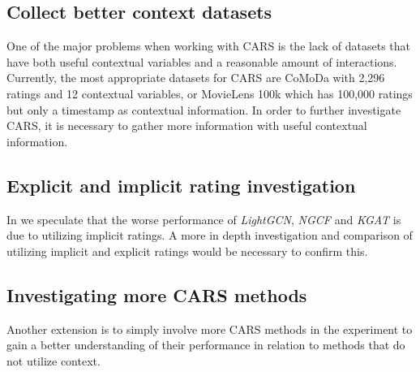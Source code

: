 \subsection{Collect better context datasets}
One of the major problems when working with CARS is the lack of datasets that have both useful contextual variables and a reasonable amount of interactions.
Currently, the most appropriate datasets for CARS are CoMoDa with 2,296 ratings and 12 contextual variables, or MovieLens 100k which has 100,000 ratings but only a timestamp as contextual information.
In order to further investigate CARS, it is necessary to gather more information with useful contextual information.

\subsection{Explicit and implicit rating investigation}
In  we speculate that the worse performance of \textit{LightGCN}, \textit{NGCF} and \textit{KGAT} is due to utilizing implicit ratings.
A more in depth investigation and comparison of utilizing implicit and explicit ratings would be necessary to confirm this.

\subsection{Investigating more CARS methods}
Another extension is to simply involve more CARS methods in the experiment to gain a better understanding of their performance in relation to methods that do not utilize context.
